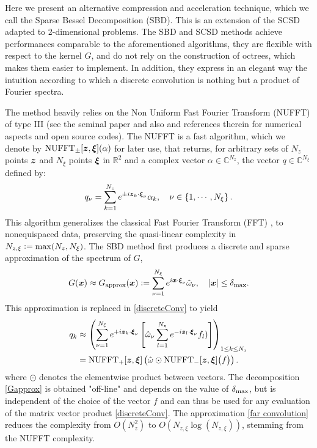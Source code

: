 \documentclass{article}
\begin{document}
Here we present an alternative compression and acceleration technique, which we call the Sparse Bessel Decomposition (SBD). This is an extension of the SCSD adapted to 2-dimensional problems. The SBD and SCSD methods achieve performances comparable to the aforementioned algorithms, they are flexible with respect to the kernel $G$, and do not rely on the construction of octrees, which makes them easier to implement. In addition, they express in an elegant way the intuition according to which a discrete convolution is nothing but a product of Fourier spectra. 

The method heavily relies on the Non Uniform Fast Fourier Transform (NUFFT) of type III (see the seminal paper \cite{NuFFT} and also \cite{greengard2004accelerating,poplau2006calculation} and references therein for numerical aspects and open source codes).  The NUFFT is a fast algorithm, which we denote by $\operatorname{NUFFT}_\pm[\boldsymbol{z},\boldsymbol{\xi}](\alpha)$ for later use, that returns, for arbitrary sets of $N_z$ points $\boldsymbol{z}$ and $N_\xi$ points $\boldsymbol{\xi}$ in $\mathbb{R}^2$ and a complex vector $\alpha  \in \mathbb{C}^{N_z}$, the vector $q \in \mathbb{C}^{N_\xi}$ defined by:
\[ q_\nu = \sum_{k = 1}^{N_z} e^{\pm i \boldsymbol{z}_k \cdot \boldsymbol{\xi}_\nu} \alpha_k, \quad \nu \in \left\{1,\cdots,N_\xi \right\}.\]
This algorithm generalizes the classical Fast Fourier Transform (FFT) \cite{cooley1965algorithm}, to nonequispaced data, preserving the quasi-linear complexity in $N_{z,\xi} \mathrel{\mathop:}= \max(N_z,N_\xi)$.
The SBD method first produces a discrete and sparse approximation of the spectrum of $G$,
\begin{equation}
	\label{Gapprox}
	G(\boldsymbol{x}) \approx G_{\text{approx}}(\boldsymbol{x}) \mathrel{\mathop:}= \sum_{\nu=1}^{N_\xi} e^{i  \boldsymbol{x}\cdot \boldsymbol{\xi}_\nu} \hat{\omega}_\nu, \quad \left\lvert \boldsymbol{x} \right\rvert \leq \delta_{\max}.
\end{equation}
This approximation is replaced in \eqref{discreteConv} to yield 
\begin{equation}
	\begin{split}	q_{k} &\approx \left(\sum_{\nu = 1}^{N_\xi} e^{+i  \boldsymbol{z}_k  \cdot\boldsymbol{\xi}_\nu } \left[\hat{\omega}_\nu \sum_{l=1}^{N_z} e^{- i \boldsymbol{z}_l \cdot \boldsymbol{\xi}_\nu} f_l) \right]\right)_{1 \leq k \leq N_z}\\
		&= \operatorname{NUFFT}_+[\boldsymbol{z},\boldsymbol{\xi}]\left(\hat{\omega} \odot \operatorname{NUFFT}_-[\boldsymbol{z},\boldsymbol{\xi}]\big(f\big)\right).
	\end{split}
	\label{far convolution}					
\end{equation}
where $\odot$ denotes the elementwise product between vectors. The decomposition \eqref{Gapprox} is obtained "off-line" and depends on the value of $\delta_{\max}$, but is independent of the choice of the vector $f$ and can thus be used for any evaluation of the matrix vector product \eqref{discreteConv}. 
The approximation \eqref{far convolution} reduces the complexity from $O(N_z^2)$ to $O(N_{z,\xi}\log (N_{z,\xi}))$, stemming from the NUFFT complexity.
\end{document}
